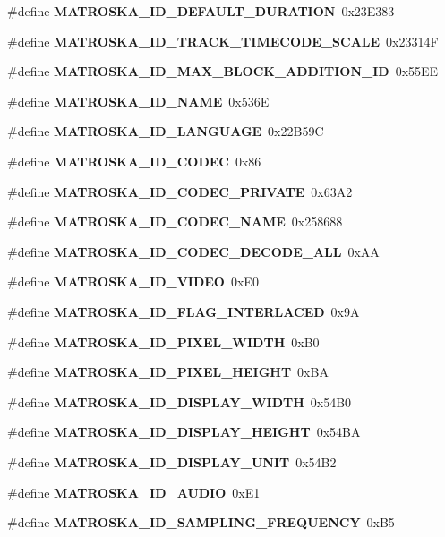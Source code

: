 \begin{DoxyCompactItemize}
\item 
\#define {\bf M\+A\+T\+R\+O\+S\+K\+A\+\_\+\+I\+D\+\_\+\+D\+E\+F\+A\+U\+L\+T\+\_\+\+D\+U\+R\+A\+T\+I\+O\+N}~0x23\+E383
\item 
\#define {\bf M\+A\+T\+R\+O\+S\+K\+A\+\_\+\+I\+D\+\_\+\+T\+R\+A\+C\+K\+\_\+\+T\+I\+M\+E\+C\+O\+D\+E\+\_\+\+S\+C\+A\+L\+E}~0x23314\+F
\item 
\#define {\bf M\+A\+T\+R\+O\+S\+K\+A\+\_\+\+I\+D\+\_\+\+M\+A\+X\+\_\+\+B\+L\+O\+C\+K\+\_\+\+A\+D\+D\+I\+T\+I\+O\+N\+\_\+\+I\+D}~0x55\+E\+E
\item 
\#define {\bf M\+A\+T\+R\+O\+S\+K\+A\+\_\+\+I\+D\+\_\+\+N\+A\+M\+E}~0x536\+E
\item 
\#define {\bf M\+A\+T\+R\+O\+S\+K\+A\+\_\+\+I\+D\+\_\+\+L\+A\+N\+G\+U\+A\+G\+E}~0x22\+B59\+C
\item 
\#define {\bf M\+A\+T\+R\+O\+S\+K\+A\+\_\+\+I\+D\+\_\+\+C\+O\+D\+E\+C}~0x86
\item 
\#define {\bf M\+A\+T\+R\+O\+S\+K\+A\+\_\+\+I\+D\+\_\+\+C\+O\+D\+E\+C\+\_\+\+P\+R\+I\+V\+A\+T\+E}~0x63\+A2
\item 
\#define {\bf M\+A\+T\+R\+O\+S\+K\+A\+\_\+\+I\+D\+\_\+\+C\+O\+D\+E\+C\+\_\+\+N\+A\+M\+E}~0x258688
\item 
\#define {\bf M\+A\+T\+R\+O\+S\+K\+A\+\_\+\+I\+D\+\_\+\+C\+O\+D\+E\+C\+\_\+\+D\+E\+C\+O\+D\+E\+\_\+\+A\+L\+L}~0x\+A\+A
\item 
\#define {\bf M\+A\+T\+R\+O\+S\+K\+A\+\_\+\+I\+D\+\_\+\+V\+I\+D\+E\+O}~0x\+E0
\item 
\#define {\bf M\+A\+T\+R\+O\+S\+K\+A\+\_\+\+I\+D\+\_\+\+F\+L\+A\+G\+\_\+\+I\+N\+T\+E\+R\+L\+A\+C\+E\+D}~0x9\+A
\item 
\#define {\bf M\+A\+T\+R\+O\+S\+K\+A\+\_\+\+I\+D\+\_\+\+P\+I\+X\+E\+L\+\_\+\+W\+I\+D\+T\+H}~0x\+B0
\item 
\#define {\bf M\+A\+T\+R\+O\+S\+K\+A\+\_\+\+I\+D\+\_\+\+P\+I\+X\+E\+L\+\_\+\+H\+E\+I\+G\+H\+T}~0x\+B\+A
\item 
\#define {\bf M\+A\+T\+R\+O\+S\+K\+A\+\_\+\+I\+D\+\_\+\+D\+I\+S\+P\+L\+A\+Y\+\_\+\+W\+I\+D\+T\+H}~0x54\+B0
\item 
\#define {\bf M\+A\+T\+R\+O\+S\+K\+A\+\_\+\+I\+D\+\_\+\+D\+I\+S\+P\+L\+A\+Y\+\_\+\+H\+E\+I\+G\+H\+T}~0x54\+B\+A
\item 
\#define {\bf M\+A\+T\+R\+O\+S\+K\+A\+\_\+\+I\+D\+\_\+\+D\+I\+S\+P\+L\+A\+Y\+\_\+\+U\+N\+I\+T}~0x54\+B2
\item 
\#define {\bf M\+A\+T\+R\+O\+S\+K\+A\+\_\+\+I\+D\+\_\+\+A\+U\+D\+I\+O}~0x\+E1
\item 
\#define {\bf M\+A\+T\+R\+O\+S\+K\+A\+\_\+\+I\+D\+\_\+\+S\+A\+M\+P\+L\+I\+N\+G\+\_\+\+F\+R\+E\+Q\+U\+E\+N\+C\+Y}~0x\+B5

\end{DoxyCompactItemize}
